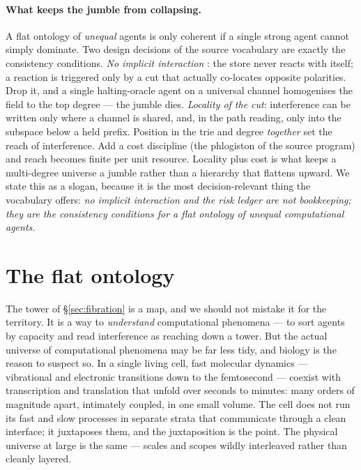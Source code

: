 \paragraph{What keeps the jumble from collapsing.}
A flat ontology of \emph{unequal} agents is only coherent if a single strong agent
cannot simply dominate. Two design decisions of the source vocabulary are exactly
the consistency conditions. \emph{No implicit interaction} \cite{paths}: the store
never reacts with itself; a reaction is triggered only by a cut that actually
co-locates opposite polarities. Drop it, and a single halting-oracle agent on a
universal channel homogenises the field to the top degree --- the jumble dies.
\emph{Locality of the cut}: interference can be written only where a channel is
shared, and, in the path reading, only into the subspace below a held prefix.
Position in the trie and degree \emph{together} set the reach of interference. Add
a cost discipline (the phlogiston of the source program) and reach becomes finite
per unit resource. Locality plus cost is what keeps a multi-degree universe a
jumble rather than a hierarchy that flattens upward. We state this as a slogan,
because it is the most decision-relevant thing the vocabulary offers: \emph{no
implicit interaction and the risk ledger are not bookkeeping; they are the
consistency conditions for a flat ontology of unequal computational agents.}


\section{The flat ontology}\label{ndo:sec:flat}

The tower of \S\ref{sec:fibration} is a map, and we should not mistake it for the
territory. It is a way to \emph{understand} computational phenomena --- to sort agents
by capacity and read interference as reaching down a tower. But the actual universe of
computational phenomena may be far less tidy, and biology is the reason to suspect so.
In a single living cell, fast molecular dynamics --- vibrational and electronic
transitions down to the femtosecond --- coexist with transcription and translation
that unfold over seconds to minutes: many orders of magnitude apart, intimately
coupled, in one small volume. The cell does not run its fast and slow processes in
separate strata that communicate through a clean interface; it juxtaposes them, and the
juxtaposition is the point. The physical universe at large is the same --- scales and
scopes wildly interleaved rather than cleanly layered.

